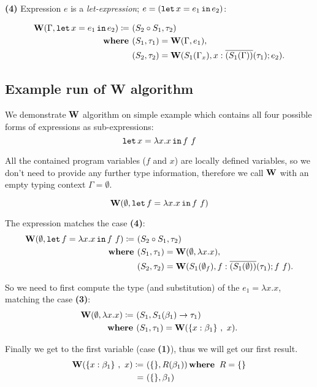 \documentclass[a4paper,oneside]{memoir}
\begin{document}
\textbf{(4)} Expression $e$ is a \textit{let-expression}; $e = (\texttt{let} \, x = e_1 \, \texttt{in} \, e_2)$:

\begin{align*}
\operatorname{\textbf{W}}(\Gamma, \texttt{let} \, x = e_1 \, \texttt{in} \, e_2) \coloneqq ~ & (S_2 \circ S_1, \tau_2) \\
\operatorname{\textbf{where~}} & (S_1, \tau_1) = \operatorname{\textbf{W}}(\Gamma, e_1), \\
       & (S_2, \tau_2) = \operatorname{\textbf{W}}(S_1(\Gamma_x),x:\overline{(S_1(\Gamma))}(\tau_1); e_2). \\
\end{align*}

\subsection{Example run of W algorithm}

We demonstrate $\operatorname{\textbf{W}}$ algorithm on simple example which contains all four possible forms of expressions as sub-expressions:
$$\texttt{let} \, x = \lambda x . x \, \texttt{in} \, f~f$$

All the contained program variables
($f$ and $x$) are locally defined variables, so we don't need to provide any further type
information, therefore we call $\operatorname{\textbf{W}}$ with an empty typing context $\Gamma = \emptyset$. 

$$\operatorname{\textbf{W}}(\emptyset, \texttt{let} \, f = \lambda x . x \, \texttt{in} \, f~f)$$

The expression matches the case \textbf{(4)}:
\begin{align*}
\operatorname{\textbf{W}}(\emptyset, \texttt{let} \, f = \lambda x . x \, \texttt{in} \, f~f) \coloneqq ~ & (S_2 \circ S_1, \tau_2) \\
\operatorname{\textbf{where~}} & (S_1, \tau_1) = \operatorname{\textbf{W}}(\emptyset, \lambda x . x), \\
       & (S_2, \tau_2) = \operatorname{\textbf{W}}(S_1(\emptyset_f),f:\overline{(S_1(\emptyset))}(\tau_1); f~f).
\end{align*}

So we need to first compute the type (and substitution) of the $e_1 = \lambda x . x$, matching the case \textbf{(3)}:
\begin{align*}
\operatorname{\textbf{W}}(\emptyset, \lambda x .x) \coloneqq ~ & (S_1, S_1(\beta_1) \rightarrow \tau_1 ) \\
\operatorname{\textbf{where~}} & (S_1, \tau_1) = \operatorname{\textbf{W}}(\{x : \beta_1 \}~,~ x).
\end{align*}

Finally we get to the first variable (case \textbf{(1)}), thus we will get our first result.
\begin{align*}
\operatorname{\textbf{W}}(\{x : \beta_1 \}~,~ x) \coloneqq ~ & ( \{\}, R(\beta_1) ) \operatorname{\textbf{where~}}  R = \{\} \\
                              = ~ & ( \{\}, \beta_1 )
\end{align*}
\end{document}
